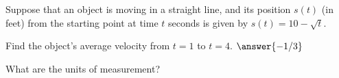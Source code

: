 \documentclass{ximera}
\begin{document}
\begin{problem}
  Suppose that an object is moving in a straight line, and its
  position $s(t)$ (in feet) from the starting point at time $t$
  seconds is given by $s(t)=10-\sqrt{t}$.
  \begin{exercise}
    Find the object's average velocity from $t=1$ to
    $t=4$. $\answer{-1/3}$
  \end{exercise}
  \begin{problem}
    What are the units of measurement?
    \begin{multipleChoice}
    \end{multipleChoice}
  \end{problem}
\end{problem}
\end{document}
